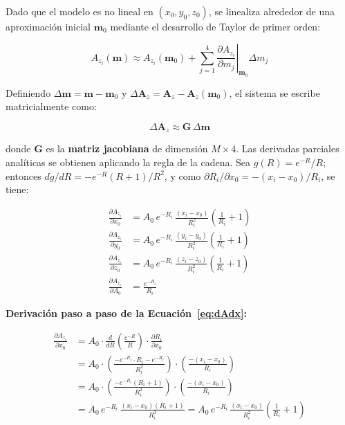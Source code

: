 \documentclass[12pt, a4paper]{article}
\begin{document}
Dado que el modelo es no lineal en $(x_0, y_0, z_0)$, se linealiza
alrededor de una aproximación inicial $\mathbf{m}_0$ mediante el
desarrollo de Taylor de primer orden:

\begin{equation}
    A_{z_i}(\mathbf{m}) \approx A_{z_i}(\mathbf{m}_0)
    + \sum_{j=1}^{4} \left.\frac{\partial A_{z_i}}{\partial m_j}
    \right|_{\mathbf{m}_0} \!\!\Delta m_j
    \label{eq:taylor}
\end{equation}

Definiendo $\Delta\mathbf{m} = \mathbf{m} - \mathbf{m}_0$ y
$\Delta\mathbf{A}_z = \mathbf{A}_z - \mathbf{A}_z(\mathbf{m}_0)$,
el sistema se escribe matricialmente como:

\begin{equation}
    \Delta\mathbf{A}_z \approx \mathbf{G}\,\Delta\mathbf{m}
    \label{eq:sistema_matricial}
\end{equation}

donde $\mathbf{G}$ es la \textbf{matriz jacobiana} de dimensión
$M \times 4$. Las derivadas parciales analíticas se obtienen aplicando
la regla de la cadena. Sea $g(R) = e^{-R}/R$; entonces
$dg/dR = -e^{-R}(R+1)/R^2$, y como
$\partial R_i/\partial x_0 = -(x_i-x_0)/R_i$, se tiene:

\begin{align}
    \frac{\partial A_{z_i}}{\partial x_0} &=
    A_0\,e^{-R_i}\,\frac{(x_i - x_0)}{R_i^2}
    \left(\frac{1}{R_i} + 1\right) \label{eq:dAdx}\\[4pt]
    \frac{\partial A_{z_i}}{\partial y_0} &=
    A_0\,e^{-R_i}\,\frac{(y_i - y_0)}{R_i^2}
    \left(\frac{1}{R_i} + 1\right) \label{eq:dAdy}\\[4pt]
    \frac{\partial A_{z_i}}{\partial z_0} &=
    A_0\,e^{-R_i}\,\frac{(z_i - z_0)}{R_i^2}
    \left(\frac{1}{R_i} + 1\right) \label{eq:dAdz}\\[4pt]
    \frac{\partial A_{z_i}}{\partial A_0} &=
    \frac{e^{-R_i}}{R_i} \label{eq:dAdA0}
\end{align}

\noindent\textbf{Derivación paso a paso de la Ecuación~\eqref{eq:dAdx}:}

\begin{align*}
    \frac{\partial A_{z_i}}{\partial x_0}
    &= A_0 \cdot \frac{d}{dR}\!\left(\frac{e^{-R}}{R}\right)
       \cdot \frac{\partial R_i}{\partial x_0} \\[4pt]
    &= A_0 \cdot \left(\frac{-e^{-R_i}\cdot R_i - e^{-R_i}}{R_i^2}\right)
       \cdot \left(\frac{-(x_i - x_0)}{R_i}\right) \\[4pt]
    &= A_0 \cdot \left(\frac{-e^{-R_i}(R_i + 1)}{R_i^2}\right)
       \cdot \left(\frac{-(x_i - x_0)}{R_i}\right) \\[4pt]
    &= A_0\,e^{-R_i}\,\frac{(x_i - x_0)(R_i + 1)}{R_i^3}
     = A_0\,e^{-R_i}\,\frac{(x_i - x_0)}{R_i^2}
       \left(\frac{1}{R_i} + 1\right)
\end{align*}
\end{document}
